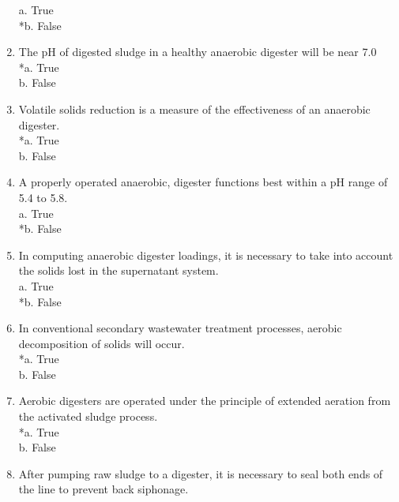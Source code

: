 \begin{enumerate}
a. True \\
*b. False \\

\item  The pH of digested sludge in a healthy anaerobic digester will be near 7.0 \\

*a. True \\
b. False \\

\item  Volatile solids reduction is a measure of the effectiveness of an anaerobic digester. \\

*a. True \\
b. False \\

\item  A properly operated anaerobic, digester functions best within a pH range of 5.4 to 5.8. \\

a. True \\
*b. False \\

\item  In computing anaerobic digester loadings, it is necessary to take into account the solids lost in the supernatant system. \\

a. True \\
*b. False \\

\item  In conventional secondary wastewater treatment processes, aerobic decomposition of solids will occur. \\

*a. True \\
b. False \\

\item  Aerobic digesters are operated under the principle of extended aeration from the activated sludge process. \\

*a. True \\
b. False \\

\item  After pumping raw sludge to a digester, it is necessary to seal both ends of the line to prevent back siphonage. \\


\end{enumerate}

